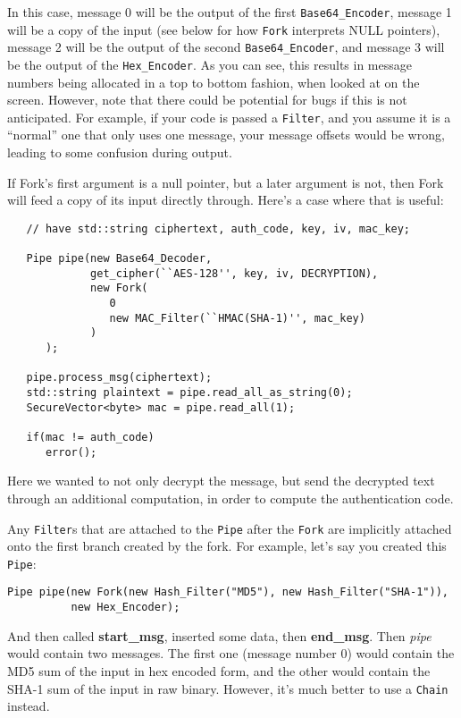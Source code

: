 \documentclass{article}
\newcommand{\function}[1]{\textbf{#1}}
\newcommand{\type}[1]{\texttt{#1}}
\renewcommand{\arg}[1]{\textsl{#1}}
\begin{document}
In this case, message 0 will be the output of the first \type{Base64\_Encoder},
message 1 will be a copy of the input (see below for how \type{Fork} interprets
NULL pointers), message 2 will be the output of the second
\type{Base64\_Encoder}, and message 3 will be the output of the
\type{Hex\_Encoder}. As you can see, this results in message numbers being
allocated in a top to bottom fashion, when looked at on the screen. However,
note that there could be potential for bugs if this is not anticipated. For
example, if your code is passed a \type{Filter}, and you assume it is a
``normal'' one that only uses one message, your message offsets would be
wrong, leading to some confusion during output.

If Fork's first argument is a null pointer, but a later argument is
not, then Fork will feed a copy of its input directly through. Here's
a case where that is useful:

\begin{verbatim}
   // have std::string ciphertext, auth_code, key, iv, mac_key;

   Pipe pipe(new Base64_Decoder,
             get_cipher(``AES-128'', key, iv, DECRYPTION),
             new Fork(
                0
                new MAC_Filter(``HMAC(SHA-1)'', mac_key)
             )
      );

   pipe.process_msg(ciphertext);
   std::string plaintext = pipe.read_all_as_string(0);
   SecureVector<byte> mac = pipe.read_all(1);

   if(mac != auth_code)
      error();
\end{verbatim}

Here we wanted to not only decrypt the message, but send the decrypted
text through an additional computation, in order to compute the
authentication code.

Any \type{Filter}s that are attached to the \type{Pipe} after the
\type{Fork} are implicitly attached onto the first branch created by
the fork. For example, let's say you created this \type{Pipe}:

\begin{verbatim}
Pipe pipe(new Fork(new Hash_Filter("MD5"), new Hash_Filter("SHA-1")),
          new Hex_Encoder);
\end{verbatim}

And then called \function{start\_msg}, inserted some data, then
\function{end\_msg}. Then \arg{pipe} would contain two messages. The
first one (message number 0) would contain the MD5 sum of the input in
hex encoded form, and the other would contain the SHA-1 sum of the
input in raw binary. However, it's much better to use a \type{Chain}
instead.
\end{document}
